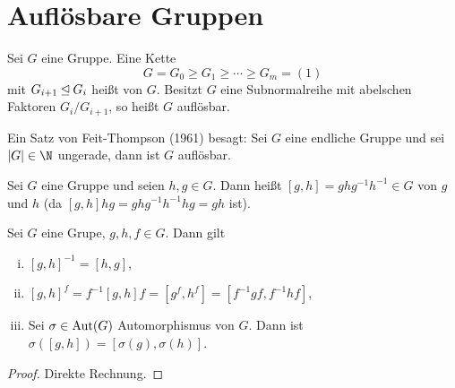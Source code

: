 
\section{Auflösbare Gruppen}

\begin{df} \label{20.3-1}
	Sei $G$ eine Gruppe.
	Eine Kette
	\[
		G = G_0 \ge G_1 \ge \dotsb \ge G_m = (1)
	\]
	mit $G_{i+1} \mathbin{\trianglelefteq} G_i$ heißt  von $G$.
	Besitzt $G$ eine Subnormalreihe mit abelschen Faktoren $G_i / G_{i+1}$, so heißt $G$ auflösbar.
\end{df}

Ein Satz von Feit-Thompson (1961) besagt:
Sei $G$ eine endliche Gruppe und sei $|G| \in \N$ ungerade, dann ist $G$ auflösbar.

\begin{df} \label{20.3-2}
	Sei $G$ eine Gruppe und seien $h,g \in G$.
	Dann heißt $[g, h] = ghg^{-1}h^{-1} \in G$  von $g$ und $h$ (da $[g,h]hg = ghg^{-1}h^{-1}hg = gh$ ist).
\end{df}

\begin{lem} \label{20.3-3}
	Sei $G$ eine Grupe, $g, h, f \in G$.
	Dann gilt
	\begin{enumerate}[i)]
		\item
			$[g, h]^{-1} = [h, g]$,
		\item
			$[g, h]^f = f^{-1} [g,h] f = [g^f, h^f] = [f^{-1}g f, f^{-1} h f]$,
		\item
			Sei $\sigma \in \operatorname{Aut}(G)$ Automorphismus von $G$.
			Dann ist $\sigma([g,h]) = [\sigma(g), \sigma(h)]$.
	\end{enumerate}
	\begin{proof}
		Direkte Rechnung.
	\end{proof}
\end{lem}

